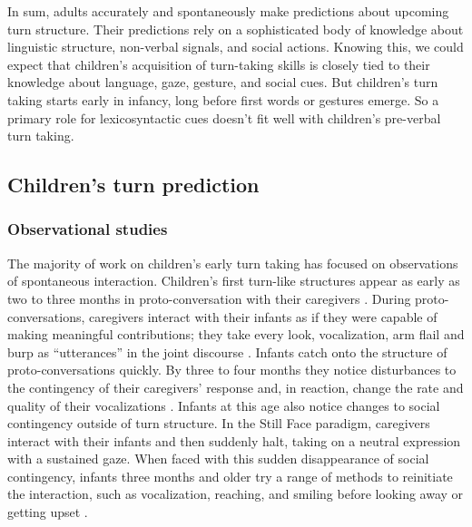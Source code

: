 \documentclass[authoryear, 12pt]{elsarticle}
\begin{document}
In sum, adults accurately and spontaneously make predictions about upcoming turn structure. Their predictions rely on a sophisticated body of knowledge about linguistic structure, non-verbal signals, and social actions. Knowing this, we could expect that children's acquisition of turn-taking skills is closely tied to their knowledge about language, gaze, gesture, and social cues. But children's turn taking starts early in infancy, long before first words or gestures emerge. So a primary role for lexicosyntactic cues doesn't fit well with children's pre-verbal turn taking.

\subsection{Children's turn prediction}

\subsubsection{Observational studies}

The majority of work on children's early turn taking has focused on observations of spontaneous interaction. Children's first turn-like structures appear as early as two to three months in proto-conversation with their caregivers \citep{bruner1975, bruner1985}. During proto-conversations, caregivers interact with their infants as if they were capable of making meaningful contributions; they take every look, vocalization, arm flail and burp as ``utterances'' in the joint discourse \citep{bateson1975, jaffe2001, snow1977}. Infants catch onto the structure of proto-conversations quickly. By three to four months they notice disturbances to the contingency of their caregivers' response and, in reaction, change the rate and quality of their vocalizations \citep{k-bloom1988, masataka1993}. Infants at this age also notice changes to social contingency outside of turn structure. In the Still Face paradigm, caregivers interact with their infants and then suddenly halt, taking on a neutral expression with a sustained gaze. When faced with this sudden disappearance of social contingency, infants three months and older try a range of methods to reinitiate the interaction, such as vocalization, reaching, and smiling before looking away or getting upset \citep{rochat1998, toda1993}.
\end{document}
